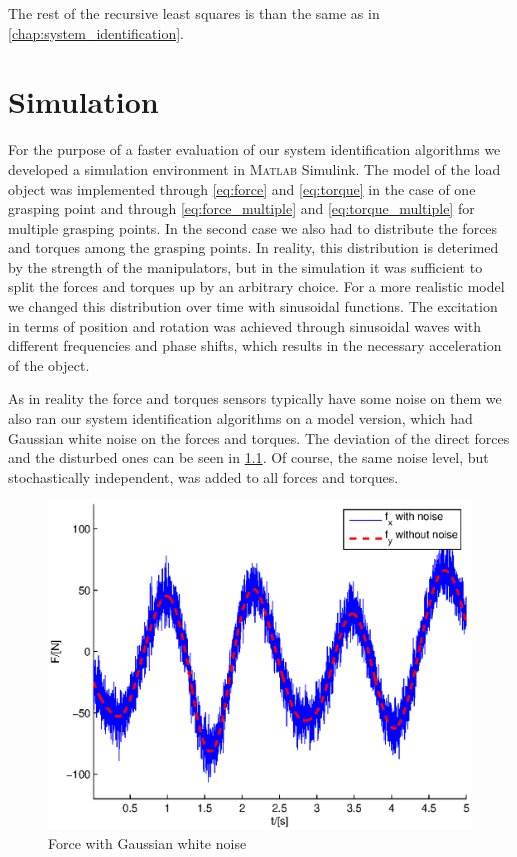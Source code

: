 The rest of the recursive least squares is than the same as in \ref{chap:system_identification}.

\chapter{Simulation}
\label{chap:simulation}
For the purpose of a faster evaluation of our system identification algorithms we developed a simulation environment in \textsc{Matlab} Simulink. The model of the load object was implemented through \ref{eq:force} and \ref{eq:torque} in the case of one grasping point and through \ref{eq:force_multiple} and \ref{eq:torque_multiple} for multiple grasping points. In the second case we also had to distribute the forces and torques among the grasping points. In reality, this distribution is deterimed by the strength of the manipulators, but in the simulation it was sufficient to split the forces and torques up by an arbitrary choice. For a more realistic model we changed this distribution over time with sinusoidal functions. The excitation in terms of position and rotation was achieved through sinusoidal waves with different frequencies and phase shifts, which results in the necessary acceleration of the object.

As in reality the force and torques sensors typically have some noise on them we also ran our system identification algorithms on a model version, which had Gaussian white noise on the forces and torques. The deviation of the direct forces and the disturbed ones can be seen in \ref{fig:force_noisy}. Of course, the same noise level, but stochastically independent, was added to all forces and torques.

\begin{figure}
	\centering
	\includegraphics[scale=.7]{figures/force_noisy.eps}
	\caption{Force with Gaussian white noise}
	\label{fig:force_noisy}
\end{figure}

